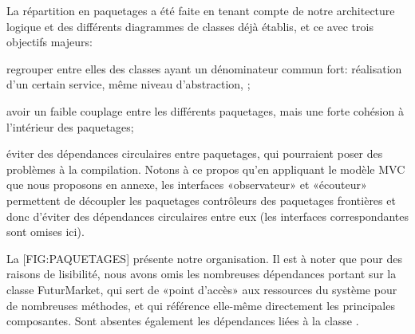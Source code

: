 La répartition en paquetages a été faite en tenant compte de notre architecture logique et des différents diagrammes de classes déjà établis, et ce avec trois objectifs majeurs:

\startitemize[n]
\item regrouper entre elles des classes ayant un dénominateur commun fort: réalisation d'un certain service, même niveau d'abstraction, \etc;
\item avoir un faible couplage entre les différents paquetages, mais une forte cohésion à l'intérieur des paquetages;
\item éviter des dépendances circulaires entre paquetages, qui pourraient poser des problèmes à la compilation. 
    Notons à ce propos qu'en appliquant le modèle MVC que nous proposons en annexe, les interfaces «observateur» et «écouteur» permettent de découpler les paquetages contrôleurs des paquetages frontières et donc d'éviter des dépendances circulaires entre eux (les interfaces correspondantes sont omises ici).
\stopitemize

La [FIG:PAQUETAGES] présente notre organisation.
Il est à noter que pour des raisons de lisibilité, nous avons omis les nombreuses dépendances portant sur la classe FuturMarket, qui sert de «point d'accès» aux ressources du système pour de nombreuses méthodes, et qui référence elle-même directement les principales composantes. Sont absentes également les dépendances liées à la classe .

